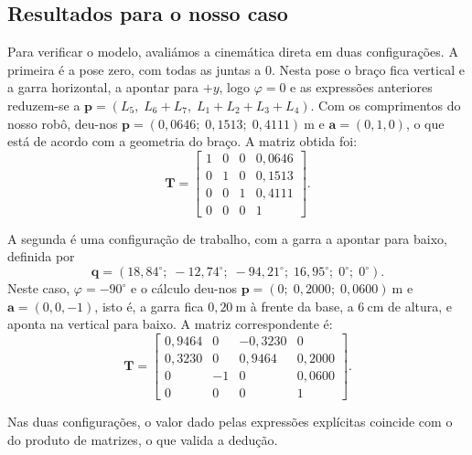 \subsection{Resultados para o nosso caso}

Para verificar o modelo, avaliámos a cinemática direta em duas configurações. A primeira é a pose zero, com todas as juntas a $0$. Nesta pose o braço fica vertical e a garra horizontal, a apontar para $+y$, logo $\varphi=0$ e as expressões anteriores reduzem-se a $\mathbf{p}=(L_5,\;L_6+L_7,\;L_1+L_2+L_3+L_4)$. Com os comprimentos do nosso robô, deu-nos $\mathbf{p}=(0{,}0646;\;0{,}1513;\;0{,}4111)~\mathrm{m}$ e $\mathbf{a}=(0,1,0)$, o que está de acordo com a geometria do braço. A matriz obtida foi:
\begin{equation*}
\mathbf{T}=\begin{bmatrix} 1&0&0&0{,}0646\\ 0&1&0&0{,}1513\\ 0&0&1&0{,}4111\\ 0&0&0&1 \end{bmatrix}.
\end{equation*}

A segunda é uma configuração de trabalho, com a garra a apontar para baixo, definida por
\begin{equation*}
\mathbf{q}=(18{,}84^\circ;\;-12{,}74^\circ;\;-94{,}21^\circ;\;16{,}95^\circ;\;0^\circ;\;0^\circ).
\end{equation*}
Neste caso, $\varphi=-90^\circ$ e o cálculo deu-nos $\mathbf{p}=(0;\;0{,}2000;\;0{,}0600)~\mathrm{m}$ e $\mathbf{a}=(0,0,-1)$, isto é, a garra fica $0{,}20~\mathrm{m}$ à frente da base, a $6~\mathrm{cm}$ de altura, e aponta na vertical para baixo. A matriz correspondente é:
\begin{equation*}
\mathbf{T}=\begin{bmatrix} 0{,}9464&0&-0{,}3230&0\\ 0{,}3230&0&0{,}9464&0{,}2000\\ 0&-1&0&0{,}0600\\ 0&0&0&1 \end{bmatrix}.
\end{equation*}

Nas duas configurações, o valor dado pelas expressões explícitas coincide com o do produto de matrizes, o que valida a dedução.
